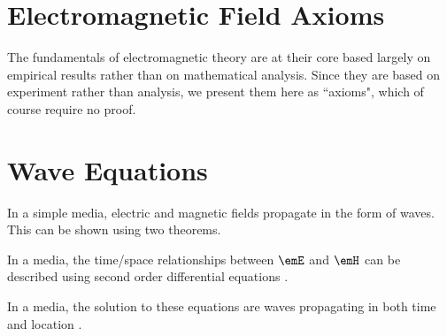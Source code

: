 \section{Electromagnetic Field Axioms}
The fundamentals of electromagnetic theory are at their core based
largely on empirical results rather than on mathematical analysis.
Since they are based on experiment rather than analysis,
we present them here as ``axioms", which of course require no proof.

\begin{axiom}
\label{ax:mf}
\end{axiom}

\begin{axiom}
\label{ax:ma}
\end{axiom}

\begin{axiom}
\label{ax:mgd}
\end{axiom}

\begin{axiom}
\label{ax:mgb}
\end{axiom}

\section{Wave Equations}
In a simple media, electric and magnetic fields propagate in the form of waves.
This can be shown using two theorems.
\begin{liste}
   \item In a  media,
         the time/space relationships between $\emE$ and $\emH$
         can be described using second order differential equations
        .
   \item In a  media,
         the solution to these equations are waves propagating in both time and location
        .
\end{liste}

